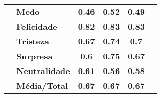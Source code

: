 \begin{table}[]
\begin{tabular}{llcccc}
                                       & \textbf{Medo}         & \textbf{0.46}                         & \textbf{0.52}                          & \textbf{0.49}                         &                                       \\
                                       & \textbf{Felicidade}   & \textbf{0.82}                         & \textbf{0.83}                          & \textbf{0.83}                         &                                       \\
                                       & \textbf{Tristeza}     & \textbf{0.67}                         & \textbf{0.74}                          & \textbf{0.7}                          &                                       \\
                                       & \textbf{Surpresa}     & \textbf{0.6}                          & \textbf{0.75}                          & \textbf{0.67}                         &                                       \\
                                       & \textbf{Neutralidade} & \textbf{0.61}                         & \textbf{0.56}                          & \textbf{0.58}                         &                                       \\
                                       & \textbf{Média/Total}  & \textbf{0.67}                         & \textbf{0.67}                          & \textbf{0.67}                         &                                       \\ \hline
\end{tabular}
\end{table}



